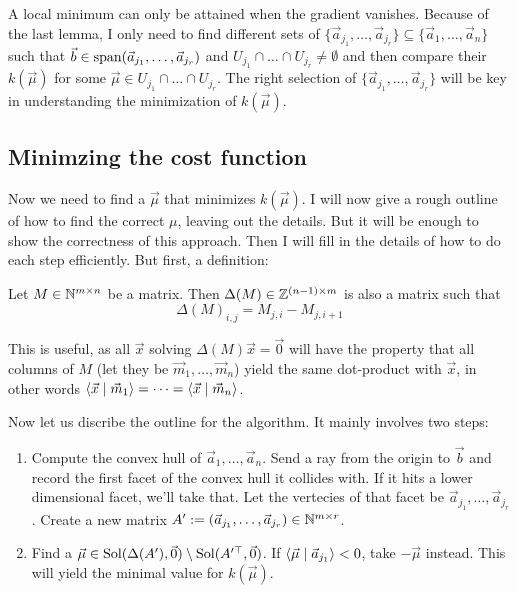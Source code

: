A local minimum can only be attained when the gradient vanishes. Because of the last lemma, I only need to find different sets of $\{\vec a_{j_1}, \dots, \vec a_{j_r}\} \subseteq \{\vec a_1, \dots, \vec a_n\}$ such that $\vec b \in \operatorname{span}(\vec a_{j_1}, \dots, \vec a_{j_r})$ and $U_{j_1} \cap \dots \cap U_{j_r} \neq \emptyset$ and then compare their $k(\vec\mu)$ for some $\vec\mu \in U_{j_1} \cap \dots \cap U_{j_r}$. The right selection of $\{\vec a_{j_1}, \dots, \vec a_{j_r}\}$ will be key in understanding the minimization of $k(\vec\mu)$. 

\subsection{Minimzing the cost function}
Now we need to find a $\vec\mu$ that minimizes $k(\vec\mu)$. I will now give a rough outline of how to find the correct $\mu$, leaving out the details. But it will be enough to show the correctness of this approach. Then I will fill in the details of how to do each step efficiently. But first, a definition:
\begin{definition}
    Let $M \in \mathbb{N}^{m\times n}$ be a matrix. Then $\Delta(M) \in \mathbb{Z}^{(n-1)\times m}$ is also a matrix such that 
    $$\Delta(M)_{i,j} = M_{j,i} - M_{j,i+1}$$
\end{definition}
\begin{observation}
    \label{obs:delta_meaning}
    This is useful, as all $\vec x$ solving $\Delta(M)\vec x = \vec 0$ will have the property that all columns of $M$ (let they be $\vec m_1, \dots, \vec m_n$) yield the same dot-product with $\vec x$, in other words $\langle \vec x \mid \vec m_1 \rangle = \dots = \langle \vec x \mid \vec m_n \rangle$.
\end{observation}

Now let us discribe the outline for the algorithm. It mainly involves two steps:
\begin{algorithm}
    \label{algo}
    \begin{enumerate}
        \item Compute the convex hull of $\vec a_1, \dots, \vec a_n$. Send a ray from the origin to $\vec b$ and record the first facet of the convex hull it collides with. If it hits a lower dimensional facet, we'll take that. Let the vertecies of that facet be $\vec a_{j_1}, \dots, \vec a_{j_r}$. Create a new matrix $A' := (\vec a_{j_1}, \dots, \vec a_{j_r}) \in \mathbb{N}^{m \times r}$.
        \item Find a $\vec\mu \in \operatorname{Sol}(\Delta(A'), \vec0) \setminus \operatorname{Sol}(A'^\top, \vec0)$. If $\langle \vec\mu \mid \vec a_{j_1} \rangle<0$, take $-\vec\mu$ instead. This will yield the minimal value for $k(\vec\mu)$.
    \end{enumerate}
\end{algorithm}

